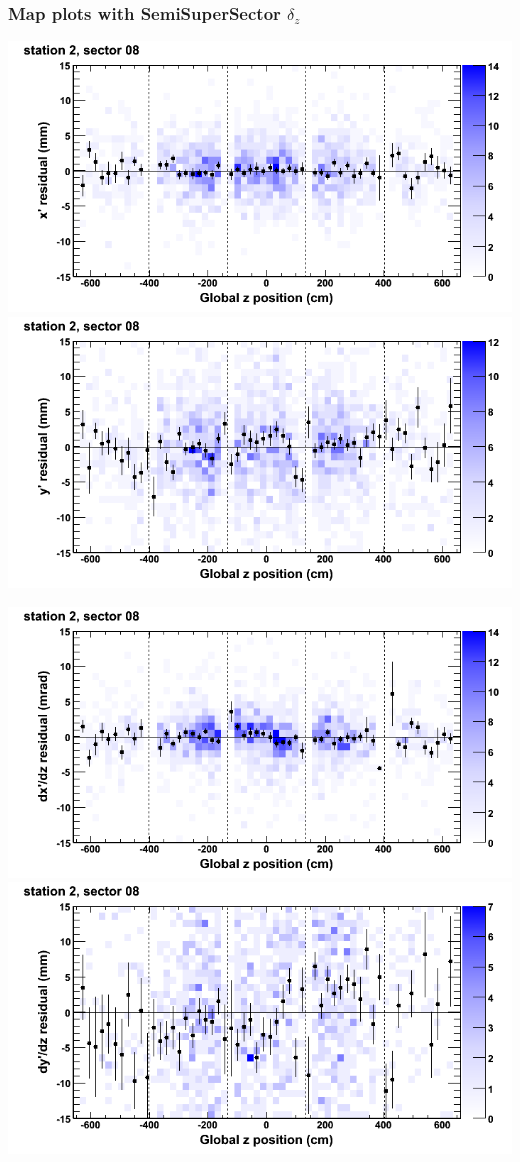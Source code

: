 \documentclass[compress]{beamer}
\begin{document}
\begin{frame}
\frametitle{Map plots with SemiSuperSector $\delta_z$}
\includegraphics[width=0.5\linewidth]{zfit_mapplots/DTvsz_st2sec08_x.png}
\includegraphics[width=0.5\linewidth]{zfit_mapplots/DTvsz_st2sec08_y.png}

\includegraphics[width=0.5\linewidth]{zfit_mapplots/DTvsz_st2sec08_dxdz.png}
\includegraphics[width=0.5\linewidth]{zfit_mapplots/DTvsz_st2sec08_dydz.png}
\end{frame}
\end{document}
